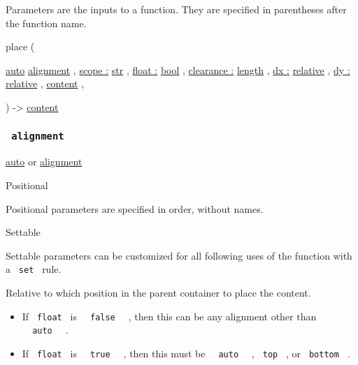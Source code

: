 \label{parameters-tooltip}
Parameters are the inputs to a function. They are specified in
parentheses after the function name.

{ place } (

{ \hyperref[parameters-alignment]{}
\href{/docs/reference/foundations/auto/}{auto}
\href{/docs/reference/layout/alignment/}{alignment} , } {
\hyperref[parameters-scope]{scope :}
\href{/docs/reference/foundations/str/}{str} , } {
\hyperref[parameters-float]{float :}
\href{/docs/reference/foundations/bool/}{bool} , } {
\hyperref[parameters-clearance]{clearance :}
\href{/docs/reference/layout/length/}{length} , } {
\hyperref[parameters-dx]{dx :}
\href{/docs/reference/layout/relative/}{relative} , } {
\hyperref[parameters-dy]{dy :}
\href{/docs/reference/layout/relative/}{relative} , } {
\href{/docs/reference/foundations/content/}{content} , }

) -\textgreater{} \href{/docs/reference/foundations/content/}{content}

\subsubsection{\texorpdfstring{\texttt{\ alignment\ }}{ alignment }}\label{parameters-alignment}

\href{/docs/reference/foundations/auto/}{auto} {or}
\href{/docs/reference/layout/alignment/}{alignment}

{{ Positional }}

\label{parameters-alignment-positional-tooltip}
Positional parameters are specified in order, without names.

{{ Settable }}

\label{parameters-alignment-settable-tooltip}
Settable parameters can be customized for all following uses of the
function with a \texttt{\ set\ } rule.

Relative to which position in the parent container to place the content.

\begin{itemize}
\tightlist
\item
  If \texttt{\ float\ } is \texttt{\ }{\texttt{\ false\ }}\texttt{\ } ,
  then this can be any alignment other than
  \texttt{\ }{\texttt{\ auto\ }}\texttt{\ } .
\item
  If \texttt{\ float\ } is \texttt{\ }{\texttt{\ true\ }}\texttt{\ } ,
  then this must be \texttt{\ }{\texttt{\ auto\ }}\texttt{\ } ,
  \texttt{\ top\ } , or \texttt{\ bottom\ } .
\end{itemize}

